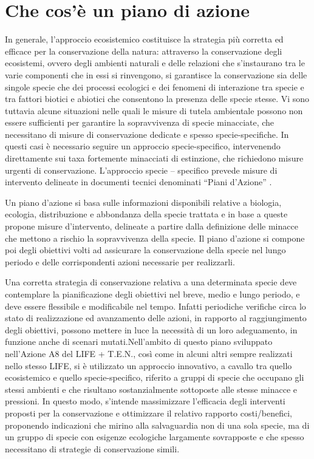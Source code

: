 \documentclass[10pt,twoside,openany,x11names,svgnames,italian,a5paper,dvipsnames,table]{memoir}
\newcommand\chapterillustration{}
\begin{document}
\setlength\afterchapskip{10mm}
\chapter{Che cos'\`e un piano di azione}
\renewcommand\chapterillustration{}
\footnotesize
In generale, l'approccio ecosistemico costituisce la strategia più corretta ed efficace per la conservazione della natura: attraverso la conservazione degli ecosistemi, ovvero degli ambienti naturali e delle relazioni che s’instaurano tra le varie componenti che in essi si rinvengono, si garantisce la conservazione sia delle singole specie che dei processi ecologici e dei fenomeni di interazione tra specie e tra fattori biotici e abiotici che consentono la presenza delle specie stesse.
Vi sono tuttavia alcune situazioni nelle quali le misure di tutela ambientale possono non essere sufficienti per garantire la sopravvivenza di specie minacciate, che necessitano di misure di conservazione dedicate e spesso specie-specifiche. In questi casi è necessario seguire un approccio specie-specifico, intervenendo direttamente sui taxa fortemente minacciati di estinzione, che richiedono misure urgenti di conservazione. L’approccio specie – specifico prevede misure di intervento delineate in documenti tecnici denominati “Piani d’Azione” \cite{EUCOUNCIL98}. 

Un piano d’azione si basa sulle informazioni disponibili relative a biologia, ecologia, distribuzione e abbondanza della specie trattata e in base a queste propone misure d’intervento, delineate a partire dalla definizione delle minacce che mettono a rischio la sopravvivenza della specie. Il piano d’azione si compone poi degli obiettivi volti ad assicurare la conservazione della specie nel lungo periodo e delle corrispondenti azioni necessarie per realizzarli.

Una corretta strategia di conservazione relativa a una determinata specie deve contemplare la pianificazione degli obiettivi nel breve, medio e lungo periodo, e deve essere flessibile e modificabile nel tempo. Infatti periodiche verifiche circa lo stato di realizzazione ed avanzamento delle azioni, in rapporto al raggiungimento degli obiettivi, possono mettere in luce la necessità di un loro adeguamento, in funzione anche di scenari mutati.Nell'ambito di questo piano sviluppato nell'Azione A8 del LIFE + T.E.N., così come in alcuni altri sempre realizzati nello stesso LIFE, si è utilizzato un approccio innovativo, a cavallo tra quello ecosistemico e quello specie-specifico, riferito a gruppi di specie che occupano gli stessi ambienti e che risultano sostanzialmente sottoposte alle stesse minacce e pressioni. In questo modo, s’intende massimizzare l'efficacia degli interventi proposti per la conservazione e ottimizzare il relativo rapporto costi/benefici, proponendo indicazioni che mirino alla salvaguardia non di una sola specie, ma di un gruppo di specie con esigenze ecologiche largamente sovrapposte e che spesso necessitano di strategie di conservazione simili.\\
\end{document}
